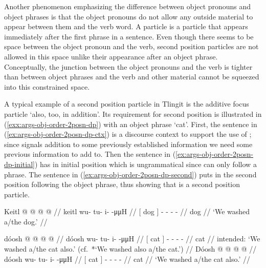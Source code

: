 Another phenomenon emphasizing the difference between object pronouns and object phrases is that the object pronouns do not allow any outside material to appear between them and the verb word.
A  particle is a particle that appears immediately after the first phrase in a sentence.
Even though there seems to be space between the object pronoun and the verb, second position particles are not allowed in this space unlike their appearance after an object phrase.
Conceptually, the junction between the object pronouns and the verb is tighter than between object phrases and the verb and other material cannot be squeezed into this constrained space.

A typical example of a second position particle in Tlingit is the additive focus particle  ‘also, too, in addition’.
Its requirement for second position is illustrated in (\ref{exx:args-obj-order-2posn-dp}) with an object phrase  ‘cat’.
First, the sentence in (\ref{ex:args-obj-order-2posn-dp-ctx}) is a discourse context to support the use of ; since  signals addition to some previously established information we need some previous information to add to.
Then the sentence in (\ref{ex:args-obj-order-2posn-dp-initial}) has  in initial position which is ungrammatical since  can only follow a phrase.
The sentence in (\ref{ex:args-obj-order-2posn-dp-second}) puts  in the second position following the object phrase, thus showing that  is a second position particle.

\ex\label{ex:args-obj-order-2posn-dp-ctx}%
%
\begingl
	\gla	{} Keitl {}  @ {} @ {} @ {} @ {} //
	\glb	{} keitl {} wu- tu- i-  -μμH //
	\glc	{}[ dog {}] - - -  - //
	\gld	{} dog {}  {} {} {} {} //
	\glft	‘We washed a/the dog.’
		//
\endgl
\xe

\pex\label{exx:args-obj-order-2posn-dp}%
\a\label{ex:args-obj-order-2posn-dp-initial}%
%
\ljudge{*}%
\begingl
	\gla	{} {} dóosh {}  @ {} @ {} @ {} @ {} //
	\glb	{} {} dóosh {} wu- tu- i-  -μμH //
	\glc	{} {}[ cat {}] - - -  - //
	\gld	{} {} cat {}  {} {} {} {} //
	\glft	intended: ‘We washed a/the cat also.’ (cf.\ *‘We washed also a/the cat.’)
		//
\endgl
\a\label{ex:args-obj-order-2posn-dp-second}%
%
\begingl
	\gla	{} Dóosh {}   @ {} @ {} @ {} @ {} //
	\glb	{} dóosh {}  wu- tu- i-  -μμH //
	\glc	{}[ cat {}]  - - -  - //
	\gld	{} cat {}   {} {} {} {} //
	\glft	‘We washed a/the cat also.’
		//
\endgl
\xe

